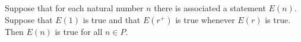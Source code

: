 Suppose that for each natural number $n$ there is associated a statement $E(n)$. Suppose that $E(1)$ is true and that $E(r^+)$ is true whenever $E(r)$ is true. Then $E(n)$ is true for all $n \in P$.
